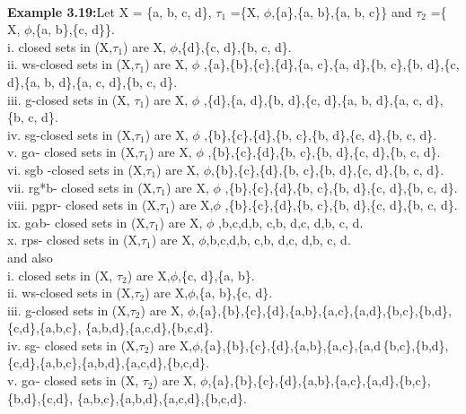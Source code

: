 {{{				\\\textbf{Example 3.19:}Let X = \{a, b, c, d\}, $\tau_{1}$ =\{X, $\phi$,\{a\},\{a, b\},\{a, b, c\}\} and  $\tau_{2}$ =\{ X, $\phi$,\{a, b\},\{c, d\}\}.
				\\ i.  closed sets in (X,$ \tau_{1}$) are X, $\phi$,\{d\},\{c, d\},\{b, c, d\}.
				\\ii.  ws-closed sets in (X,$ \tau_{1}$) are X, $\phi$ ,\{a\},\{b\},\{c\},\{d\},\{a, c\},\{a, d\},\{b, c\},\{b, d\},\{c, d\},\{a, b, d\},\{a, c, d\},\{b, c, d\}.
				\\iii. g-closed sets in (X,  $ \tau_{1}$) are X, $\phi$ ,\{d\},\{a, d\},\{b, d\},\{c, d\},\{a, b, d\},\{a, c, d\},\{b, c, d\}.
				\\iv.	sg-closed sets in (X,$ \tau_{1}$) are X, $\phi$ ,\{b\},\{c\},\{d\},\{b, c\},\{b, d\},\{c, d\},\{b, c, d\}.
				\\v. 	g$\alpha$- closed sets in (X,$ \tau_{1}$) are X, $\phi$ ,\{b\},\{c\},\{d\},\{b, c\},\{b, d\},\{c, d\},\{b, c, d\}.
				\\vi.	sgb -closed sets in (X,$ \tau_{1}$) are X,  $\phi$,\{b\},\{c\},\{d\},\{b, c\},\{b, d\},\{c, d\},\{b, c, d\}.
				\\vii.	rg*b- closed sets in (X,$ \tau_{1}$) are X, $\phi$ ,\{b\},\{c\},\{d\},\{b, c\},\{b, d\},\{c, d\},\{b, c, d\}.
				\\viii.	pgpr- closed sets in (X,$ \tau_{1}$) are X,$\phi$  ,\{b\},\{c\},\{d\},\{b, c\},\{b, d\},\{c, d\},\{b, c, d\}.
				\\ix.	g$\alpha$b- closed sets in (X,$ \tau_{1}$) are X, $\phi$ ,{b},{c},{d},{b, c},{b, d},{c, d},{b, c, d}.
				\\x.	rps- closed sets in (X,$ \tau_{1}$) are X,  $\phi$,{b},{c},{d},{b, c},{b, d},{c, d},{b, c, d}.
				\\ and also
				\\i. closed sets in (X,  $ \tau_{2}$) are X,$\phi$,\{c, d\},\{a, b\}.
				\\ii.	ws-closed sets in (X,$ \tau_{2}$) are X,$\phi$,\{a, b\},\{c, d\}.
				\\iii.	g-closed sets in (X,$ \tau_{2}$) are X, $\phi$,\{a\},\{b\},\{c\},\{d\},\{a,b\},\{a,c\},\{a,d\},\{b,c\},\{b,d\},\{c,d\},\{a,b,c\},
				\{a,b,d\},\{a,c,d\},\{b,c,d\}.
				\\iv.	sg- closed sets in (X,$ \tau_{2}$) are X,$\phi$,\{a\},\{b\},\{c\},\{d\},\{a,b\},\{a,c\},\{a,d}\,\{b,c\},\{b,d\},\{c,d\},\{a,b,c\},\{a,b,d\},\{a,c,d\},\{b,c,d\}.
			\\v.	g$\alpha$- closed sets in  (X, $ \tau_{2}$) are X, $\phi$,\{a\},\{b\},\{c\},\{d\},\{a,b\},\{a,c\},\{a,d\},\{b,c\}, \{b,d\},\{c,d\}, \{a,b,c\},\{a,b,d\},\{a,c,d\},\{b,c,d\}.
}}

